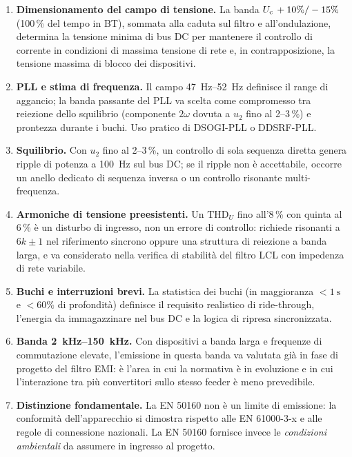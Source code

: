 \begin{enumerate}[itemsep=3pt]
  \item \textbf{Dimensionamento del campo di tensione.} La banda
        $U_{\mathrm{c}}\,+10\%/-15\%$ (100\,\% del tempo in BT), sommata alla caduta sul filtro
        e all'ondulazione, determina la tensione minima di bus DC per mantenere il
        controllo di corrente in condizioni di massima tensione di rete e, in
        contrapposizione, la tensione massima di blocco dei dispositivi.
  \item \textbf{PLL e stima di frequenza.} Il campo \SIrange{47}{52}{Hz} definisce il
        range di aggancio; la banda passante del PLL va scelta come compromesso tra
        reiezione dello squilibrio (componente $2\omega$ dovuta a $u_2$ fino al 2--3\,\%)
        e prontezza durante i buchi. Uso pratico di DSOGI-PLL o DDSRF-PLL.
  \item \textbf{Squilibrio.} Con $u_2$ fino al 2--3\,\%, un controllo di sola sequenza
        diretta genera ripple di potenza a \SI{100}{Hz} sul bus DC; se il ripple non
        è accettabile, occorre un anello dedicato di sequenza inversa o un controllo
        risonante multi-frequenza.
  \item \textbf{Armoniche di tensione preesistenti.} Un $\mathrm{THD}_U$ fino all'8\,\%
        con quinta al 6\,\% è un disturbo di ingresso, non un errore di controllo:
        richiede risonanti a $6k\pm1$ nel riferimento sincrono oppure una struttura
        di reiezione a banda larga, e va considerato nella verifica di stabilità
        del filtro LCL con impedenza di rete variabile.
  \item \textbf{Buchi e interruzioni brevi.} La statistica dei buchi
        (in maggioranza $<\SI{1}{\second}$ e $<60\%$ di profondità) definisce il
        requisito realistico di ride-through, l'energia da immagazzinare nel bus DC
        e la logica di ripresa sincronizzata.
  \item \textbf{Banda \SIrange{2}{150}{kHz}.} Con dispositivi a banda larga e frequenze
        di commutazione elevate, l'emissione in questa banda va valutata già in fase
        di progetto del filtro EMI: è l'area in cui la normativa è in evoluzione e in
        cui l'interazione tra più convertitori sullo stesso feeder è meno prevedibile.
  \item \textbf{Distinzione fondamentale.} La EN 50160 non è un limite di emissione:
        la conformità dell'apparecchio si dimostra rispetto alle EN 61000-3-x e alle
        regole di connessione nazionali. La EN 50160 fornisce invece le
        \emph{condizioni ambientali} da assumere in ingresso al progetto.
\end{enumerate}

